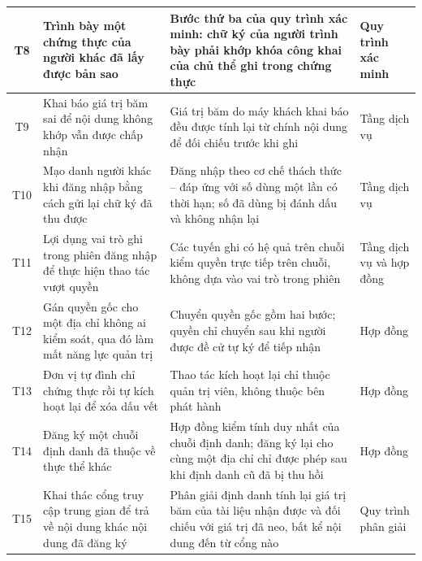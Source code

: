 \begin{longtable}{|c|p{3.6cm}|p{5.3cm}|p{3.4cm}|}
T8 & Trình bày một chứng thực của người khác đã lấy được bản sao
& Bước thứ ba của quy trình xác minh: chữ ký của người trình bày phải khớp khóa công khai của chủ thể ghi trong chứng thực
& Quy trình xác minh
\\ \hline

T9 & Khai báo giá trị băm sai để nội dung không khớp vẫn được chấp nhận
& Giá trị băm do máy khách khai báo đều được tính lại từ chính nội dung để đối chiếu trước khi ghi
& Tầng dịch vụ
\\ \hline

T10 & Mạo danh người khác khi đăng nhập bằng cách gửi lại chữ ký đã thu được
& Đăng nhập theo cơ chế thách thức -- đáp ứng với số dùng một lần có thời hạn; số đã dùng bị đánh dấu và không nhận lại
& Tầng dịch vụ
\\ \hline

T11 & Lợi dụng vai trò ghi trong phiên đăng nhập để thực hiện thao tác vượt quyền
& Các tuyến ghi có hệ quả trên chuỗi kiểm quyền trực tiếp trên chuỗi, không dựa vào vai trò trong phiên
& Tầng dịch vụ và hợp đồng
\\ \hline

T12 & Gán quyền gốc cho một địa chỉ không ai kiểm soát, qua đó làm mất năng lực quản trị
& Chuyển quyền gốc gồm hai bước; quyền chỉ chuyển sau khi người được đề cử tự ký để tiếp nhận
& Hợp đồng
\\ \hline

T13 & Đơn vị tự đình chỉ chứng thực rồi tự kích hoạt lại để xóa dấu vết
& Thao tác kích hoạt lại chỉ thuộc quản trị viên, không thuộc bên phát hành
& Hợp đồng
\\ \hline

T14 & Đăng ký một chuỗi định danh đã thuộc về thực thể khác
& Hợp đồng kiểm tính duy nhất của chuỗi định danh; đăng ký lại cho cùng một địa chỉ chỉ được phép sau khi định danh cũ đã bị thu hồi
& Hợp đồng
\\ \hline

T15 & Khai thác cổng truy cập trung gian để trả về nội dung khác nội dung đã đăng ký
& Phân giải định danh tính lại giá trị băm của tài liệu nhận được và đối chiếu với giá trị đã neo, bất kể nội dung đến từ cổng nào
& Quy trình phân giải
\\ \hline

\end{longtable}
